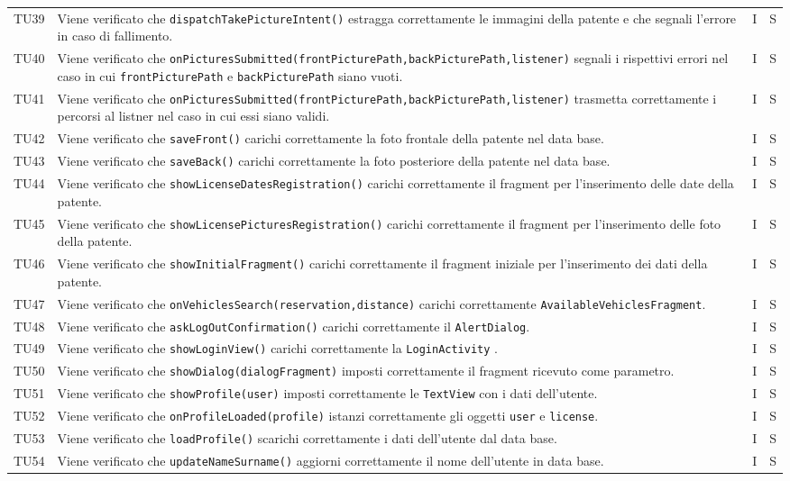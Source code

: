 \begin{longtable}{ >{\centering}p{}  >{\centering}p{} >{\centering}p{}
			>{\centering}p{}}
		TU39 & Viene verificato che \texttt{dispatchTakePictureIntent()} estragga correttamente le immagini della patente e che segnali l'errore in caso di fallimento. & I & S
		\tabularnewline	
		TU40 & Viene verificato che \texttt{onPicturesSubmitted(frontPicturePath,backPicturePath,listener)} segnali i rispettivi errori nel caso in cui \texttt{frontPicturePath} e \texttt{backPicturePath} siano vuoti. & I & S
		\tabularnewline	
		TU41 & Viene verificato che \texttt{onPicturesSubmitted(frontPicturePath,backPicturePath,listener)} trasmetta correttamente i percorsi al listner nel caso in cui essi siano validi. & I & S
		\tabularnewline	
		TU42 & Viene verificato che \texttt{saveFront()} carichi correttamente la foto frontale della patente nel data base. & I & S
		\tabularnewline	
		TU43 & Viene verificato che \texttt{saveBack()} carichi correttamente la foto posteriore della patente nel data base. & I & S
		\tabularnewline	
		TU44 & Viene verificato che \texttt{showLicenseDatesRegistration()} carichi correttamente il fragment per l'inserimento delle date della patente. & I & S
		\tabularnewline	
		TU45 & Viene verificato che \texttt{showLicensePicturesRegistration()} carichi correttamente il fragment per l'inserimento delle foto della patente. & I & S
		\tabularnewline	
		TU46 & Viene verificato che \texttt{showInitialFragment()} carichi correttamente il fragment iniziale per l'inserimento dei dati della patente. & I & S
		\tabularnewline	
		TU47 & Viene verificato che \texttt{onVehiclesSearch(reservation,distance)} carichi correttamente \texttt{AvailableVehiclesFragment}. & I & S
		\tabularnewline	
		TU48 & Viene verificato che \texttt{askLogOutConfirmation()} carichi correttamente il \texttt{AlertDialog}. & I & S
		\tabularnewline	
		TU49 & Viene verificato che \texttt{showLoginView()} carichi correttamente la \texttt{LoginActivity} . & I & S
		\tabularnewline	
		TU50 & Viene verificato che \texttt{showDialog(dialogFragment)} imposti correttamente il fragment ricevuto come parametro. & I & S
		\tabularnewline	
		TU51 & Viene verificato che \texttt{showProfile(user)} imposti correttamente le \texttt{TextView} con i dati dell'utente. & I & S
		\tabularnewline	
		TU52 & Viene verificato che \texttt{onProfileLoaded(profile)} istanzi correttamente gli oggetti \texttt{user} e \texttt{license}. & I & S
		\tabularnewline	
		TU53 & Viene verificato che \texttt{loadProfile()} scarichi correttamente i dati dell'utente dal data base. & I & S
		\tabularnewline	
		TU54 & Viene verificato che \texttt{updateNameSurname()} aggiorni correttamente il nome dell'utente in data base. & I & S

\end{longtable}
